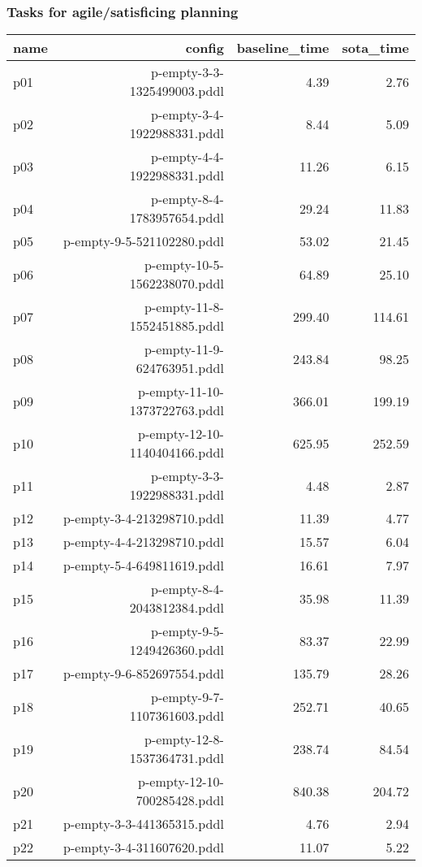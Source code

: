 \documentclass{article}
\begin{document}
                    \subsubsection*{Tasks for agile/satisficing planning}
                    
                            \begin{center}
                            \scriptsize
                            \begin{tabular}{@{}l|r|r|r@{}}
                            name & config & baseline\_time & sota\_time\\\midrule
                              p01& p-empty-3-3-1325499003.pddl&4.39&2.76\\
  p02& p-empty-3-4-1922988331.pddl&8.44&5.09\\
  p03& p-empty-4-4-1922988331.pddl&11.26&6.15\\
  p04& p-empty-8-4-1783957654.pddl&29.24&11.83\\
  p05& p-empty-9-5-521102280.pddl&53.02&21.45\\
  p06& p-empty-10-5-1562238070.pddl&64.89&25.10\\
  p07& p-empty-11-8-1552451885.pddl&299.40&114.61\\
  p08& p-empty-11-9-624763951.pddl&243.84&98.25\\
  p09& p-empty-11-10-1373722763.pddl&366.01&199.19\\
  p10& p-empty-12-10-1140404166.pddl&625.95&252.59\\
  p11& p-empty-3-3-1922988331.pddl&4.48&2.87\\
  p12& p-empty-3-4-213298710.pddl&11.39&4.77\\
  p13& p-empty-4-4-213298710.pddl&15.57&6.04\\
  p14& p-empty-5-4-649811619.pddl&16.61&7.97\\
  p15& p-empty-8-4-2043812384.pddl&35.98&11.39\\
  p16& p-empty-9-5-1249426360.pddl&83.37&22.99\\
  p17& p-empty-9-6-852697554.pddl&135.79&28.26\\
  p18& p-empty-9-7-1107361603.pddl&252.71&40.65\\
  p19& p-empty-12-8-1537364731.pddl&238.74&84.54\\
  p20& p-empty-12-10-700285428.pddl&840.38&204.72\\
  p21& p-empty-3-3-441365315.pddl&4.76&2.94\\
  p22& p-empty-3-4-311607620.pddl&11.07&5.22\\

\end{tabular}
\end{center}
\end{document}
